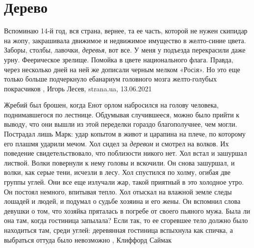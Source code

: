  
 
 
 
 
\chapter{Дерево}
\label{sec:slova.derevo}

Вспоминаю 14-й год, вся страна, вернее, та ее часть, которой не нужен скипидар
на жопу, закрашивала движимое и недвижимое имущество в желто-синие цвета.
Заборы, столбы, лавочки, \emph{деревья}, вот все. У меня у подъезда перекрасили даже
урну. Феерическое зрелище. Помойка в цвете национального флага. Правда, через
несколько дней на ней же дописали черным мелком «Росiя». Но это еще только
больше подчеркнуло ебанариум головного мозга желто-голубых покрасчиков
, 
Игорь Лесев, strana.ua, 13.06.2021

Жребий был брошен, когда Енот орлом набросился на голову человека,
поднимавшегося по лестнице. Обдумывая случившееся, можно было прийти к выводу,
что они вышли из этой переделки гораздо благополучнее, чем могли. Пострадал
лишь Марк: удар копытом в живот и царапина на плече, по которому его плашмя
ударили мечом.  Хол сидел за \emph{деревом} и смотрел на волков. Их поведение
свидетельствовало, что поблизости никого нет. Хол встал и зашуршал листвой.
Волки повернули к нему головы и вскочили. Он снова зашуршал, и волки, как серые
тени, исчезли в лесу.  Хол спустился по холму, огибая две группы углей. Они все
еще излучали жар, такой приятный в это холодное утро. Он постоял немного,
впитывая тепло.  Хол отыскал на влажной земле следы лошадей и людей, и подумал
о судьбе хозяина и его жены. Он вспомнил слова девушки о том, что хозяйка
пряталась в погребе от своего пьяного мужа. Была ли она там, когда гостиница
запылала? Если так, то ее сгоревшее тело должно было находиться там, среди
углей: деревянная гостиница вспыхнула как спичка, а выбраться оттуда было
невозможно
, Клиффорд Саймак
